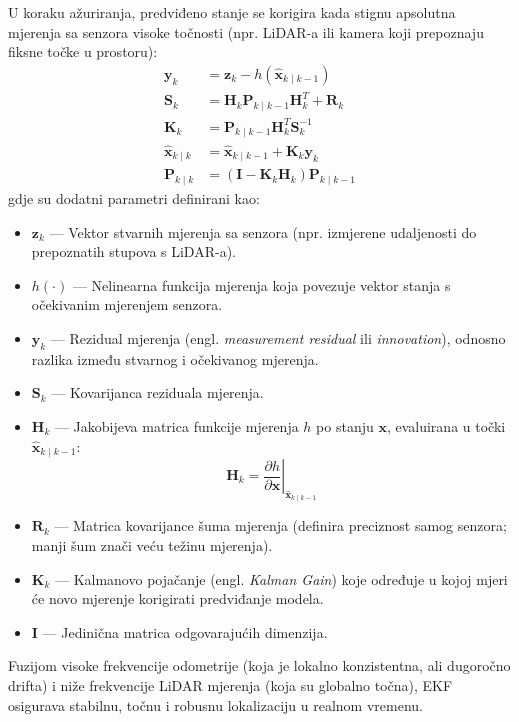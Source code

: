 \documentclass[12pt,a4paper]{article}
\begin{document}
U koraku ažuriranja, predviđeno stanje se korigira kada stignu apsolutna mjerenja sa senzora visoke točnosti (npr. LiDAR-a ili kamera koji prepoznaju fiksne točke u prostoru):
\begin{align}
    \mathbf{y}_k &= \mathbf{z}_k - h(\mathbf{\hat{x}}_{k \mid k-1}) \\
    \mathbf{S}_k &= \mathbf{H}_k \mathbf{P}_{k \mid k-1} \mathbf{H}_k^T + \mathbf{R}_k \\
    \mathbf{K}_k &= \mathbf{P}_{k \mid k-1} \mathbf{H}_k^T \mathbf{S}_k^{-1} \\
    \mathbf{\hat{x}}_{k \mid k} &= \mathbf{\hat{x}}_{k \mid k-1} + \mathbf{K}_k \mathbf{y}_k \\
    \mathbf{P}_{k \mid k} &= (\mathbf{I} - \mathbf{K}_k \mathbf{H}_k) \mathbf{P}_{k \mid k-1}
\end{align}
gdje su dodatni parametri definirani kao:
\begin{itemize}
    \item $\mathbf{z}_k$ — Vektor stvarnih mjerenja sa senzora (npr. izmjerene udaljenosti do prepoznatih stupova s LiDAR-a).
    \item $h(\cdot)$ — Nelinearna funkcija mjerenja koja povezuje vektor stanja s očekivanim mjerenjem senzora.
    \item $\mathbf{y}_k$ — Rezidual mjerenja (engl. \textit{measurement residual} ili \textit{innovation}), odnosno razlika između stvarnog i očekivanog mjerenja.
    \item $\mathbf{S}_k$ — Kovarijanca reziduala mjerenja.
    \item $\mathbf{H}_k$ — Jakobijeva matrica funkcije mjerenja $h$ po stanju $\mathbf{x}$, evaluirana u točki $\mathbf{\hat{x}}_{k \mid k-1}$:
    \begin{equation}
        \mathbf{H}_k = \left. \frac{\partial h}{\partial \mathbf{x}} \right|_{\mathbf{\hat{x}}_{k \mid k-1}}
    \end{equation}
    \item $\mathbf{R}_k$ — Matrica kovarijance šuma mjerenja (definira preciznost samog senzora; manji šum znači veću težinu mjerenja).
    \item $\mathbf{K}_k$ — Kalmanovo pojačanje (engl. \textit{Kalman Gain}) koje određuje u kojoj mjeri će novo mjerenje korigirati predviđanje modela.
    \item $\mathbf{I}$ — Jedinična matrica odgovarajućih dimenzija.
\end{itemize}
Fuzijom visoke frekvencije odometrije (koja je lokalno konzistentna, ali dugoročno drifta) i niže frekvencije LiDAR mjerenja (koja su globalno točna), EKF osigurava stabilnu, točnu i robusnu lokalizaciju u realnom vremenu.
\end{document}
